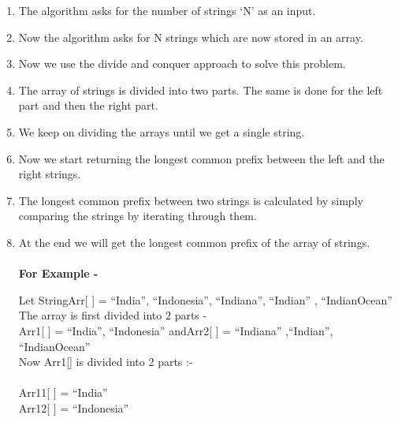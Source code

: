 \documentclass[conference]{IEEEtran}
\begin{document}
\begin{enumerate}

\item The algorithm asks for the number of strings ‘N’ as an input.\\

\item Now the algorithm asks for N strings which are now stored in an array.\\

\item Now we use the divide and conquer approach to solve this problem.
\\

\item The array of strings is divided into two parts. The same is done for the left part and then the right part. \\

\item We keep on dividing the arrays until we get a single string.
\\

\item Now we start returning the longest common prefix between the left and the right strings.
\\

\item The longest common prefix between two strings is calculated by simply comparing the strings by iterating through them.\\

\item At the end we will get the longest common prefix of the array of strings.
\\ \\

\textbf{For Example - }

Let StringArr[ ] = {“India”, “Indonesia”, “Indiana”, “Indian” , “IndianOcean”}\\

The array is first divided into 2 parts - \\


Arr1[ ] = { “India”, “Indonesia” }andArr2[ ] = {  “Indiana”    ,“Indian”,
“IndianOcean”}\\

Now Arr1[] is divided into 2 parts :-\\\\
Arr11[ ] = {“India” }\\
Arr12[ ] = { “Indonesia” }\\


\end{enumerate}
\end{document}
